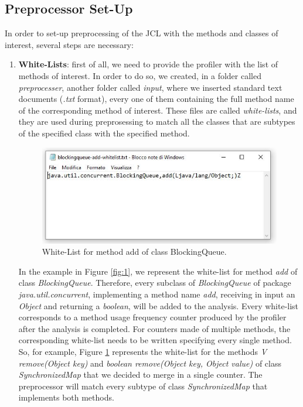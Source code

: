 \documentclass[]{usiinfthesis}
\begin{document}
\subsection{Preprocessor Set-Up}
In order to set-up preprocessing of the JCL with the methods and classes of interest, several steps are necessary:
\begin{enumerate}
    \item \textbf{White-Lists}: first of all, we need to provide the profiler with the list of methods of interest. In order to do so, we created, in a folder called \textit{preprocesser}, another folder called \textit{input}, where we inserted standard text documents (\textit{.txt} format), every one of them containing the full method name of the corresponding method of interest. These files are called \textit{white-lists}, and they are used during preprosessing to match all the classes that are subtypes of the specified class with the specified method.
    \begin{figure}[h]
        \centering
        \includegraphics[scale=0.7]{Immagini/whitelist.JPG} 
        \caption[Whitelist Example]{White-List for method add of class BlockingQueue.}
        \label{fig:2}
    \end{figure}
    \newline In the example in Figure \ref{fig:1}, we represent the white-list for method \textit{add} of class \textit{BlockingQueue}. Therefore, every subclass of \textit{BlockingQueue} of package \textit{java.util.concurrent}, implementing a method name \textit{add}, receiving in input an \textit{Object} and returning a \textit{boolean}, will be added to the analysis.
    \newline Every white-list corresponds to a method usage frequency counter produced by the profiler after the analysis is completed. For counters made of multiple methods, the corresponding white-list needs to be written specifying every single method. So, for example, Figure \ref{fig:2} represents the white-list for the methods \textit{V remove(Object key)} and \textit{boolean remove(Object key, Object value)} of class \textit{SynchronizedMap} that we decided to merge in a single counter. The preprocessor will match every subtype of class \textit{SynchronizedMap} that implements both methods.

\end{enumerate}
\end{document}
